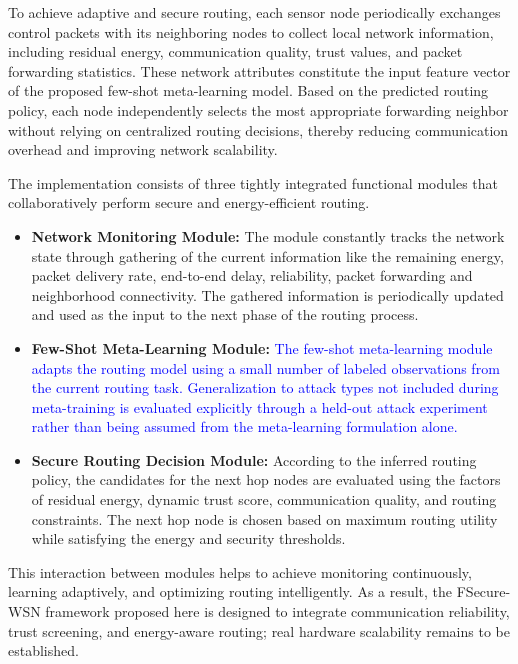 \documentclass[pdflatex,sn-mathphys-num]{sn-jnl}
\begin{document}
To achieve adaptive and secure routing, each sensor node periodically exchanges control packets with its neighboring nodes to collect local network information, including residual energy, communication quality, trust values, and packet forwarding statistics. These network attributes constitute the input feature vector of the proposed few-shot meta-learning model. Based on the predicted routing policy, each node independently selects the most appropriate forwarding neighbor without relying on centralized routing decisions, thereby reducing communication overhead and improving network scalability.

The implementation consists of three tightly integrated functional modules that collaboratively perform secure and energy-efficient routing.

\begin{itemize}

\item \textbf{Network Monitoring Module:}
The module constantly tracks the network state through gathering of the current information like the remaining energy, packet delivery rate, end-to-end delay, reliability, packet forwarding and neighborhood connectivity. The gathered information is periodically updated and used as the input to the next phase of the routing process.

\item \textbf{Few-Shot Meta-Learning Module:}
\textcolor{blue}{The few-shot meta-learning module adapts the routing
model using a small number of labeled observations from the current routing
task. Generalization to attack types not included during meta-training is
evaluated explicitly through a held-out attack experiment rather than being
assumed from the meta-learning formulation alone.}

\item \textbf{Secure Routing Decision Module:}
According to the inferred routing policy, the candidates for the next hop nodes are evaluated using the factors of residual energy, dynamic trust score, communication quality, and routing constraints. The next hop node is chosen based on maximum routing utility while satisfying the energy and security thresholds.

\end{itemize}

This interaction between modules helps to achieve monitoring continuously, learning adaptively, and optimizing routing intelligently. As a result, the FSecure-WSN framework proposed here is designed to integrate communication reliability, trust screening, and energy-aware routing; real hardware scalability remains to be established.
\end{document}

